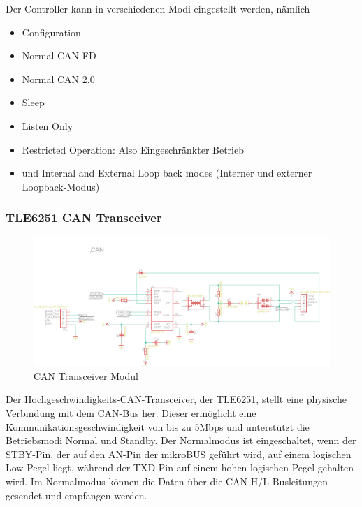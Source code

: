 Der Controller kann in verschiedenen Modi eingestellt werden, nämlich
\begin{itemize}
	\item Configuration
	\item Normal CAN FD
	\item Normal CAN 2.0
	\item Sleep
	\item Listen Only
	\item Restricted Operation: Also Eingeschränkter Betrieb
	\item und Internal and External Loop back modes (Interner und externer Loopback-Modus)
\end{itemize}
\subsubsection{TLE6251 CAN Transceiver}
\begin{figure}[H]
	\begin{center}		\includegraphics[width=1.2\textwidth]{./images/can_transceiver_eagle.jpg}
	\end{center}
	\vspace{-5pt}
	\caption[CAN Transceiver Modul]{CAN Transceiver Modul} %
	\label{fig:can:transceiver}
	\vspace{-5pt}
\end{figure}

Der Hochgeschwindigkeits-CAN-Transceiver, der TLE6251, stellt eine physische Verbindung mit dem CAN-Bus her. Dieser ermöglicht eine Kommunikationsgeschwindigkeit von bis zu 5Mbps und unterstützt die Betriebsmodi Normal und Standby. Der Normalmodus ist eingeschaltet, wenn der STBY-Pin, der auf den AN-Pin der mikroBUS geführt wird, auf einem logischen Low-Pegel liegt, während der TXD-Pin auf einem hohen logischen Pegel gehalten wird. Im Normalmodus können die Daten über die CAN H/L-Busleitungen gesendet und empfangen werden.


